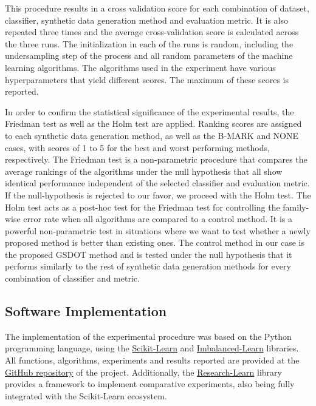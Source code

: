 \documentclass[10pt,letterpaper]{article}
\begin{document}
This procedure results in a cross validation score for each combination of dataset, classifier, synthetic data generation method and evaluation metric. It is also repeated three times and the average cross-validation score is calculated across the three runs. The initialization in each of the runs is random, including the undersampling step of the process and all random parameters of the machine learning algorithms. The algorithms used in the experiment have various hyperparameters that yield different scores. The maximum of these scores is reported.

In order to confirm the statistical significance of the experimental results, the Friedman test as well as the Holm test \cite{JanezDemsar.2006} are applied. Ranking scores are assigned to each synthetic data generation method, as well as the B-MARK and NONE cases, with scores of 1 to 5 for the best and worst performing methods, respectively. The Friedman test is a non-parametric procedure that compares the average rankings of the algorithms under the null hypothesis that all show identical performance independent of the selected classifier and evaluation metric. If the null-hypothesis is rejected to our favor, we proceed with the Holm test. The Holm test acts as a post-hoc test for the Friedman test for controlling the family-wise error rate when all algorithms are compared to a control method. It is a powerful non-parametric test in situations where we want to test whether a newly proposed method is better than existing ones. The control method in our case is the proposed GSDOT method and is tested under the null hypothesis that it performs similarly to the rest of synthetic data generation methods for every combination of classifier and metric.

\subsection{Software Implementation}

The implementation of the experimental procedure was based on the Python
programming language, using the \href{https://scikit-learn.org/stable/}{Scikit-Learn} \cite{Pedregosa.2011} and \href{https://imbalanced-learn.org/en/stable/}{Imbalanced-Learn} \cite{Lemaitre.2017} libraries. All functions, algorithms, experiments and results reported are provided at the \href{https://github.com/NOVA-IMS-Innovation-and-Analytics-Lab/publications/tree/master/various/small-data-oversampling}{GitHub repository} of the project. Additionally, the \href{https://research-learn.readthedocs.io/en/latest/?badge=latest}{Research-Learn} library provides a framework to implement comparative experiments, also being fully integrated with the Scikit-Learn ecosystem.
\end{document}
